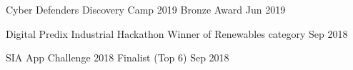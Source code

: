 
\begin{cvhonors}



  \cvhonor
    {Cyber Defenders Discovery Camp 2019} %
    {Bronze Award} %
    {} %
    {Jun 2019} %




  \cvhonor
    {Digital Predix Industrial Hackathon} %
    {Winner of Renewables category} %
    {} %
    {Sep 2018} %



\cvhonor
    {SIA App Challenge 2018} %
    {Finalist (Top 6)} %
    {} %
    {Sep 2018} %




\end{cvhonors}
